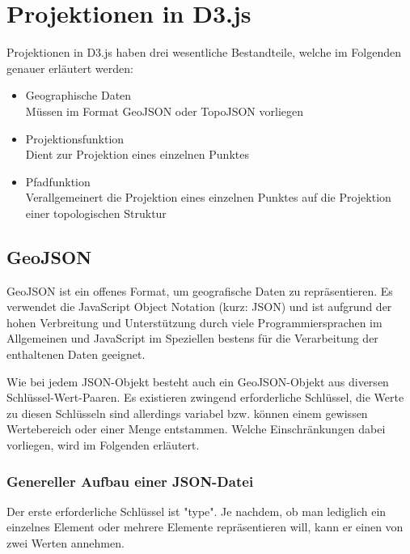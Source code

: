 \chapter{Projektionen in D3.js}
\label{ch:projections-in-d3js}

\nocite{d3api:2018}

Projektionen in D3.js haben drei wesentliche Bestandteile, welche im Folgenden genauer erläutert werden:

\begin{itemize}
    \item Geographische Daten
            \\Müssen im Format GeoJSON oder TopoJSON vorliegen
    \item Projektionsfunktion
            \\Dient zur Projektion eines einzelnen Punktes
    \item Pfadfunktion
            \\Verallgemeinert die Projektion eines einzelnen Punktes auf die Projektion einer topologischen Struktur
\end{itemize}

\section{GeoJSON}

GeoJSON ist ein offenes Format, um geografische Daten zu repräsentieren. Es verwendet die JavaScript Object Notation (kurz: JSON) und ist aufgrund der hohen Verbreitung und Unterstützung durch viele Programmiersprachen im Allgemeinen und JavaScript im Speziellen bestens für die Verarbeitung der enthaltenen Daten geeignet.

Wie bei jedem JSON-Objekt besteht auch ein GeoJSON-Objekt aus diversen Schlüssel-Wert-Paaren. Es existieren zwingend erforderliche Schlüssel, die Werte zu diesen Schlüsseln sind allerdings variabel bzw. können einem gewissen Wertebereich oder einer Menge entstammen. Welche Einschränkungen dabei vorliegen, wird im Folgenden erläutert.

\subsection{Genereller Aufbau einer JSON-Datei}

Der erste erforderliche Schlüssel ist "type". Je nachdem, ob man lediglich ein einzelnes Element oder mehrere Elemente repräsentieren will, kann er einen von zwei Werten annehmen.

